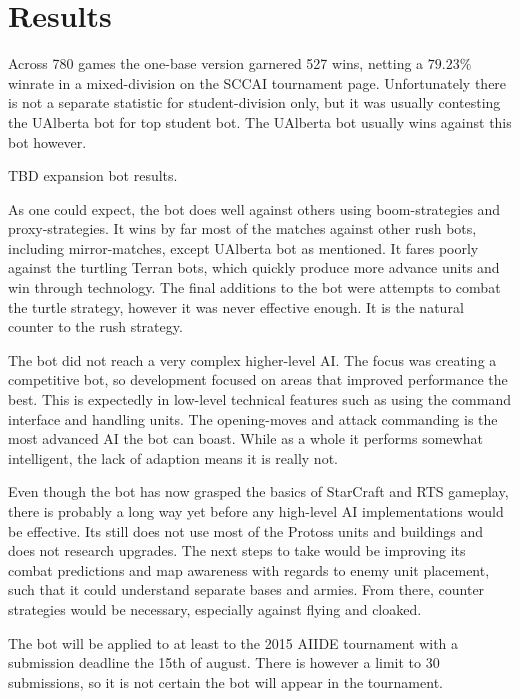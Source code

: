 \chapter{Results}
Across 780 games the one-base version garnered 527 wins, netting a $79.23\%$ winrate in a mixed-division on the SCCAI tournament page. Unfortunately there is not a separate statistic for student-division only, but it was usually contesting the UAlberta bot for top student bot. The UAlberta bot usually wins against this bot however.

TBD expansion bot results.

As one could expect, the bot does well against others using boom-strategies and proxy-strategies. It wins by far most of the matches against other rush bots, including mirror-matches, except UAlberta bot as mentioned. It fares poorly against the turtling Terran bots, which quickly produce more advance units and win through technology. The final additions to the bot were attempts to combat the turtle strategy, however it was never effective enough. It is the natural counter to the rush strategy.

The bot did not reach a very complex higher-level AI. The focus was creating a competitive bot, so development focused on areas that improved performance the best. This is expectedly in low-level technical features such as using the command interface and handling units. The opening-moves and attack commanding is the most advanced AI the bot can boast.  While as a whole it performs somewhat intelligent, the lack of adaption means it is really not.

Even though the bot has now grasped the basics of StarCraft and RTS gameplay, there is probably a long way yet before any high-level AI implementations would be effective. Its still does not use most of the Protoss units and buildings and does not research upgrades. The next steps to take would be improving its combat predictions and map awareness with regards to enemy unit placement, such that it could understand separate bases and armies. From there, counter strategies would be necessary, especially against flying and cloaked.

The bot will be applied to at least to the 2015 AIIDE tournament with a submission deadline the 15th of august. There is however a limit to 30 submissions, so it is not certain the bot will appear in the tournament.